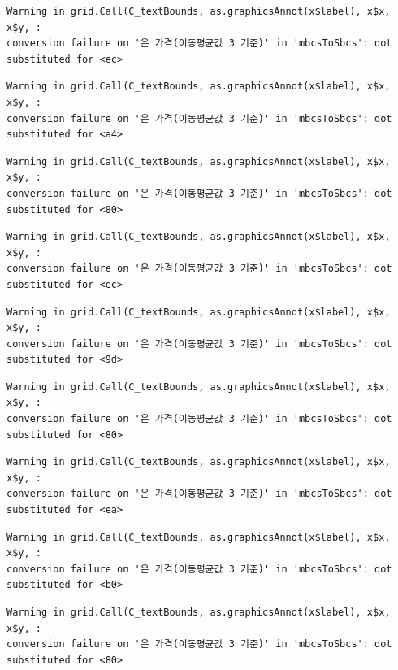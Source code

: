 \documentclass[
  letterpaper,
  DIV=11,
  numbers=noendperiod]{scrreprt}
\begin{document}
\begin{verbatim}
Warning in grid.Call(C_textBounds, as.graphicsAnnot(x$label), x$x, x$y, :
conversion failure on '은 가격(이동평균값 3 기준)' in 'mbcsToSbcs': dot
substituted for <ec>
\end{verbatim}

\begin{verbatim}
Warning in grid.Call(C_textBounds, as.graphicsAnnot(x$label), x$x, x$y, :
conversion failure on '은 가격(이동평균값 3 기준)' in 'mbcsToSbcs': dot
substituted for <a4>
\end{verbatim}

\begin{verbatim}
Warning in grid.Call(C_textBounds, as.graphicsAnnot(x$label), x$x, x$y, :
conversion failure on '은 가격(이동평균값 3 기준)' in 'mbcsToSbcs': dot
substituted for <80>
\end{verbatim}

\begin{verbatim}
Warning in grid.Call(C_textBounds, as.graphicsAnnot(x$label), x$x, x$y, :
conversion failure on '은 가격(이동평균값 3 기준)' in 'mbcsToSbcs': dot
substituted for <ec>
\end{verbatim}

\begin{verbatim}
Warning in grid.Call(C_textBounds, as.graphicsAnnot(x$label), x$x, x$y, :
conversion failure on '은 가격(이동평균값 3 기준)' in 'mbcsToSbcs': dot
substituted for <9d>
\end{verbatim}

\begin{verbatim}
Warning in grid.Call(C_textBounds, as.graphicsAnnot(x$label), x$x, x$y, :
conversion failure on '은 가격(이동평균값 3 기준)' in 'mbcsToSbcs': dot
substituted for <80>
\end{verbatim}

\begin{verbatim}
Warning in grid.Call(C_textBounds, as.graphicsAnnot(x$label), x$x, x$y, :
conversion failure on '은 가격(이동평균값 3 기준)' in 'mbcsToSbcs': dot
substituted for <ea>
\end{verbatim}

\begin{verbatim}
Warning in grid.Call(C_textBounds, as.graphicsAnnot(x$label), x$x, x$y, :
conversion failure on '은 가격(이동평균값 3 기준)' in 'mbcsToSbcs': dot
substituted for <b0>
\end{verbatim}

\begin{verbatim}
Warning in grid.Call(C_textBounds, as.graphicsAnnot(x$label), x$x, x$y, :
conversion failure on '은 가격(이동평균값 3 기준)' in 'mbcsToSbcs': dot
substituted for <80>
\end{verbatim}
\end{document}
